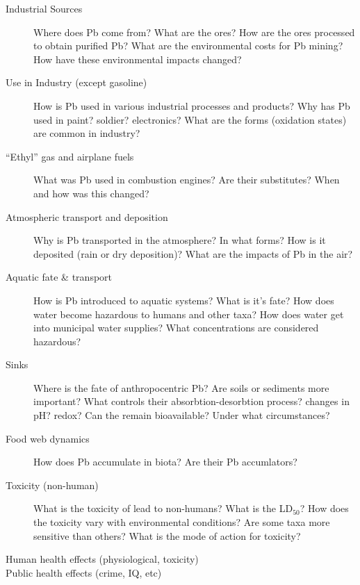 \documentclass{article}\usepackage[]{graphicx}\usepackage[]{color}
\begin{document}
\begin{description}
\begin{description}
  \item[Industrial Sources] Where does Pb come from? What are the ores?  How are the ores processed to obtain purified Pb? What are the environmental costs for Pb mining? How have these environmental impacts changed?
  \item[Use in Industry (except gasoline)] How is Pb used in various industrial processes and products?  Why has Pb used in paint?  soldier? electronics?  What are the forms (oxidation states) are common in industry?
  \item[``Ethyl'' gas and airplane fuels] What was Pb used in combustion engines? Are their substitutes? When and how was this changed? 
  \item[Atmospheric transport and deposition] Why is Pb transported in the atmosphere?  In what forms?  How is it deposited (rain or dry deposition)? What are the impacts of Pb in the air?
  \item[Aquatic fate \& transport] How is Pb introduced to aquatic systems?  What is it's fate?  How does water become hazardous to humans and other taxa?  How does water get into municipal water supplies?  What concentrations are considered hazardous?
  \item[Sinks] Where is the fate of anthropocentric Pb? Are soils or sediments more important?  What controls their absorbtion-desorbtion process? changes in pH? redox?  Can the remain bioavailable? Under what circumstances? 
  \item[Food web dynamics] How does Pb accumulate in biota?  Are their Pb accumlators?
  \item[Toxicity (non-human)] What is the toxicity of lead to non-humans?  What is the LD$_50$? How does the toxicity vary with environmental conditions? Are some taxa more sensitive than others?  What is the mode of action for toxicity?
  \item[Human health effects (physiological, toxicity)] 
  \item[Public health effects (crime, IQ, etc)]
\end{description}



\end{description}
\end{document}
